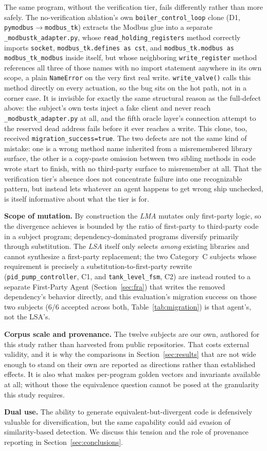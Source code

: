The same program, without the verification tier, fails differently rather than more safely. The no-verification ablation's own \texttt{boiler\_control\_loop} clone (D1, \texttt{pymodbus}$\to$\texttt{modbus\_tk}) extracts the Modbus glue into a separate \texttt{\_modbustk\_adapter.py}, whose \texttt{read\_holding\_registers} method correctly imports \texttt{socket}, \texttt{modbus\_tk.defines as cst}, and \texttt{modbus\_tk.modbus as modbus\_tk\_modbus} inside itself, but whose neighboring \texttt{write\_register} method references all three of those names with no import statement anywhere in its own scope, a plain \texttt{NameError} on the very first real write. \texttt{write\_valve()} calls this method directly on every actuation, so the bug sits on the hot path, not in a corner case. It is invisible for exactly the same structural reason as the full-\sys defect above: the subject's own tests inject a fake client and never reach \texttt{\_modbustk\_adapter.py} at all, and the fifth oracle layer's connection attempt to the reserved dead address fails before it ever reaches a write. This clone, too, received \texttt{migration\_success=true}. The two defects are not the same kind of mistake: one is a wrong method name inherited from a misremembered library surface, the other is a copy-paste omission between two sibling methods in code \sys wrote start to finish, with no third-party surface to misremember at all. That the verification tier's absence does not concentrate failure into one recognizable pattern, but instead lets whatever an agent happens to get wrong ship unchecked, is itself informative about what the tier is for.

\textbf{Scope of mutation.}
By construction the \emph{LMA} mutates only first-party logic, so the divergence \sys achieves is bounded by the ratio of first-party to third-party code in a subject program; dependency-dominated programs diversify primarily through substitution. The \emph{LSA} itself only selects \emph{among} existing libraries and cannot synthesize a first-party replacement; the two Category~C subjects whose requirement is precisely a substitution-to-first-party rewrite (\texttt{pid\_pump\_controller}, C1, and \texttt{tank\_level\_fsm}, C2) are instead routed to a separate First-Party Agent (Section~\ref{sec:fra}) that writes the removed dependency's behavior directly, and this evaluation's migration success on those two subjects (6/6 accepted across both, Table~\ref{tab:migration}) is that agent's, not the LSA's.

\textbf{Corpus scale and provenance.}
The twelve subjects are our own, authored for this study rather than harvested from public repositories. That costs external validity, and it is why the comparisons in Section~\ref{sec:results} that are not wide enough to stand on their own are reported as directions rather than established effects. It is also what makes per-program golden vectors and invariants available at all; without those the equivalence question cannot be posed at the granularity this study requires.

\textbf{Dual use.}
The ability to generate equivalent-but-divergent code is defensively valuable for diversification, but the same capability could aid evasion of similarity-based detection. We discuss this tension and the role of provenance reporting in Section~\ref{sec:conclusions}.
